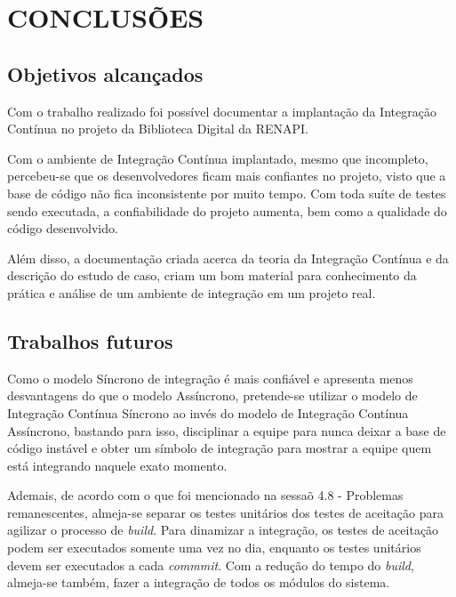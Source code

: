 \chapter{CONCLUSÕES}

\section{Objetivos alcançados}

Com o trabalho realizado foi possível documentar a implantação da Integração Contínua no projeto da Biblioteca Digital da RENAPI.

Com o ambiente de Integração Contínua implantado, mesmo que incompleto, percebeu-se que os desenvolvedores ficam mais confiantes no projeto, visto que a base de código não fica inconsistente por muito tempo. Com toda suíte de testes sendo executada, a confiabilidade do projeto aumenta, bem como a qualidade do código desenvolvido.

Além disso, a documentação criada acerca da teoria da Integração Contínua e da descrição do estudo de caso, criam um bom material para conhecimento da prática e análise de um ambiente de integração em um projeto real.

\section{Trabalhos futuros}

Como o modelo Síncrono de integração é mais confiável e apresenta menos desvantagens do que o modelo Assíncrono, pretende-se utilizar o modelo de Integração Contínua Síncrono ao invés do modelo de Integração Contínua Assíncrono, bastando para isso, disciplinar a equipe para nunca deixar a base de código instável e obter um símbolo de integração para mostrar a equipe quem está integrando naquele exato momento.

Ademais, de acordo com o que foi mencionado na sessaõ 4.8 - Problemas remanescentes, almeja-se separar os testes unitários dos testes de aceitação para agilizar o processo de \textit{build}. Para dinamizar a integração, os testes de aceitação podem ser executados somente uma vez no dia, enquanto os testes unitários devem ser executados a cada \textit{commmit}. Com a redução do tempo do \textit{build}, almeja-se também, fazer a integração de todos os módulos do sistema.
